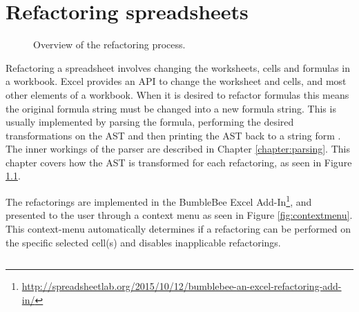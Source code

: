 
\chapter{Refactoring spreadsheets}
\label{chapter:implementingrefactorings}

\noindent
\begin{figure}[h!]
\hspace*{0.003\textwidth}

\caption{Overview of the refactoring process.}
\label{fig:chapterrefactoringintrofigure}
\end{figure}

Refactoring a spreadsheet involves changing the worksheets, cells and formulas in a workbook.
Excel provides an API to change the worksheet and cells, and most other elements of a workbook.
When it is desired to refactor formulas this means the original formula string must be changed into a new formula string.
This is usually implemented by parsing the formula, performing the desired transformations on the AST and then printing the AST back to a string form \cite{fowler1999refactoring}.
The inner workings of the parser are described in Chapter \ref{chapter:parsing}.
This chapter covers how the AST is transformed for each refactoring, as seen in Figure \ref{fig:chapterrefactoringintrofigure}.

The refactorings are implemented in the BumbleBee Excel Add-In\footnote{\url{http://spreadsheetlab.org/2015/10/12/bumblebee-an-excel-refactoring-add-in/}}, and presented to the user through a context menu as seen in Figure \ref{fig:contextmenu}.
This context-menu automatically determines if a refactoring can be performed on the specific selected cell(s) and disables inapplicable refactorings.


\newpage

\section{}
\label{refac:extractformula}

